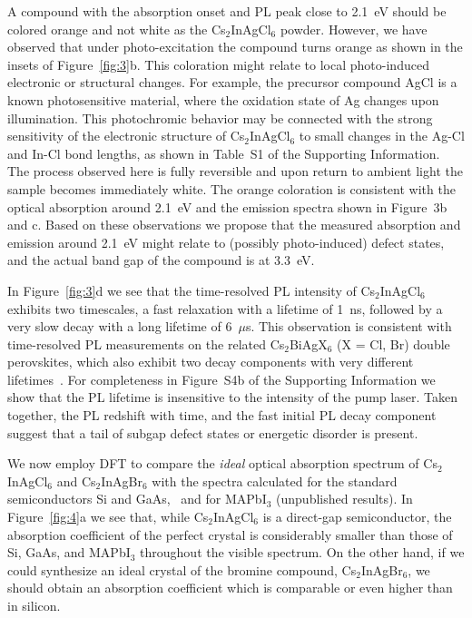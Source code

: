 \documentclass[journal=jpcl,manuscript=letter,layout=traditional]{achemso}
\begin{document}
A compound with the absorption onset and PL peak close to 2.1~eV should be colored orange
and not white as the Cs$_2$InAgCl$_6$ powder. However, we have observed that under photo-excitation
the compound turns orange as shown in the insets of Figure~\ref{fig:3}b.
This coloration might relate to local
photo-induced electronic or structural changes. For example, the precursor compound AgCl is a known
photosensitive material, where the oxidation state of Ag changes upon illumination.
This photochromic behavior may be connected with the strong sensitivity of the electronic
structure of Cs$_2$InAgCl$_6$ to small changes in the Ag-Cl and In-Cl bond lengths,
as shown in Table~S1 of the Supporting Information.
The process observed here
is fully reversible and upon return to ambient light the sample becomes immediately white.
The orange coloration
is consistent with the optical absorption around 2.1~eV and the emission spectra shown
in Figure~3b and c. Based on these observations we propose that the measured absorption and
emission around 2.1~eV might relate to (possibly photo-induced) defect states, and the
actual band gap of the compound is at 3.3~eV.



In Figure~\ref{fig:3}d we see
that the time-resolved PL intensity of Cs$_2$InAgCl$_6$ exhibits two timescales, a fast
relaxation with a lifetime of 1~ns, followed by a very slow decay with a long lifetime of
6~$\mu$s. This observation is consistent with time-resolved PL measurements on the
related Cs$_2$BiAgX$_6$ (X = Cl, Br) double perovskites, which also exhibit two decay
components with very different lifetimes~\cite{Slavney2016}.
For completeness in Figure~S4b of the Supporting Information we show that the PL lifetime
is insensitive to the intensity of the pump laser. Taken together, the PL redshift with time,
and the fast initial PL decay component suggest that a tail of
subgap defect states or energetic disorder is present.



We now employ DFT to compare the {\it ideal} optical absorption spectrum of Cs$_2$InAgCl$_6$ and
Cs$_2$InAgBr$_6$ with the spectra calculated for the standard semiconductors Si and GaAs,~\cite{Marios2016}
and for MAPbI$_3$ (unpublished results). In Figure~\ref{fig:4}a we see that, while
Cs$_2$InAgCl$_6$ is a direct-gap semiconductor, the absorption coefficient of the perfect crystal is considerably
smaller than those of Si, GaAs, and MAPbI$_3$ throughout the visible spectrum. On the other hand,
if we could synthesize an ideal crystal of the bromine compound, Cs$_2$InAgBr$_6$, we should obtain
an absorption coefficient which is comparable or even higher than in silicon.
\end{document}
